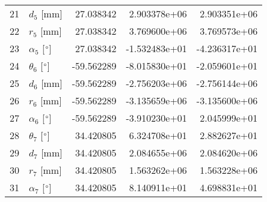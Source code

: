 \documentclass{standalone}%
\begin{document}
\begin{tabular}{llrrr}
21 &              $d_{5}$ [mm] &  27.038342 &  2.903378e+06 &  2.903351e+06 \\
22 &              $r_{5}$ [mm] &  27.038342 &  3.769600e+06 &  3.769573e+06 \\
23 &  $\alpha_{5}$ [$\degree$] &  27.038342 & -1.532483e+01 & -4.236317e+01 \\
24 &  $\theta_{6}$ [$\degree$] & -59.562289 & -8.015830e+01 & -2.059601e+01 \\
25 &              $d_{6}$ [mm] & -59.562289 & -2.756203e+06 & -2.756144e+06 \\
26 &              $r_{6}$ [mm] & -59.562289 & -3.135659e+06 & -3.135600e+06 \\
27 &  $\alpha_{6}$ [$\degree$] & -59.562289 & -3.910230e+01 &  2.045999e+01 \\
28 &  $\theta_{7}$ [$\degree$] &  34.420805 &  6.324708e+01 &  2.882627e+01 \\
29 &              $d_{7}$ [mm] &  34.420805 &  2.084655e+06 &  2.084620e+06 \\
30 &              $r_{7}$ [mm] &  34.420805 &  1.563262e+06 &  1.563228e+06 \\
31 &  $\alpha_{7}$ [$\degree$] &  34.420805 &  8.140911e+01 &  4.698831e+01 \\
\bottomrule
\end{tabular}
%
\end{document}
